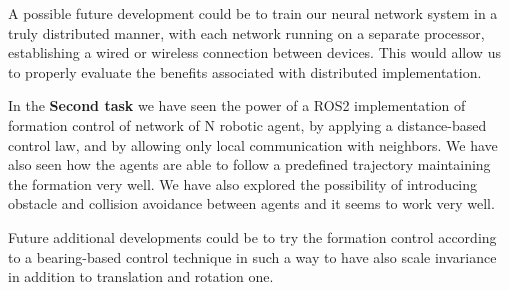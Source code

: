\documentclass[a4paper,11pt,oneside]{book}
\begin{document}
A possible future development could be to train our neural network system in a truly distributed manner, with each network running on a separate processor, establishing a wired or wireless connection between devices. This would allow us to properly evaluate the benefits associated with distributed implementation.

\bigskip
In the \textbf{Second task} we have seen the power of a ROS2 implementation of formation control of network of N robotic agent, by applying a distance-based control law, and by allowing only local communication with neighbors. We have also seen how the agents are able to follow a predefined trajectory maintaining the formation very well.
We have also explored the possibility of introducing obstacle and collision avoidance between agents and it seems to work very well. 

Future additional developments could be to try the formation control according to a bearing-based control technique in such a way to have also scale invariance in addition to translation and rotation one.


%


\end{document}
